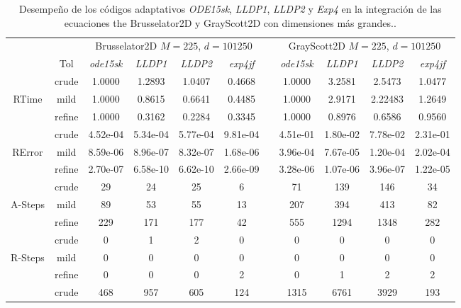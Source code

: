 \begin{table}
    \caption{Desempeño de los códigos adaptativos \emph{ODE15sk}, \emph{LLDP1}, \emph{LLDP2} y \emph{Exp4} en la integración de las ecuaciones the Brusselator2D y GrayScott2D con dimensiones más grandes..}
    \label{tab:Largerbruss2DGrayScott}
    \begin{adjustbox}{width=0.98\columnwidth,center}
        \begin{tabular}{ccccccccccc}
            \hline
            &  & \multicolumn{4}{c}{Brusselator2D $M=225$, $d=101250$} &  & \multicolumn{4}{c}{GrayScott2D $M=225$, $d=101250$} \\
            \cline{3-6}\cline{8-11} & Tol & \emph{ode15sk} & \emph{LLDP1} & \emph{LLDP2} & \emph{exp4jf} &  & \emph{ode15sk} & \emph{LLDP1} & \emph{LLDP2} & \emph{exp4jf} \\
            \hline
            & crude & 1.0000 & 1.2893 & 1.0407 & 0.4668 &  & 1.0000 & 3.2581 & 2.5473 & 1.0477 \\
            RTime & mild & 1.0000 & 0.8615 & 0.6641 & 0.4485 &  & 1.0000 & 2.9171 & 2.22483 & 1.2649 \\
            & refine & 1.0000 & 0.3162 & 0.2284 & 0.3345 &  & 1.0000 & 0.8976 & 0.6586 & 0.9560 \\
            \hline
            & crude & 4.52e-04 & 5.34e-04 & 5.77e-04 & 9.81e-04 &  & 4.51e-01 & 1.80e-02 & 7.78e-02 & 2.31e-01 \\
            RError & mild & 8.59e-06 & 8.96e-07 & 8.32e-07 & 1.68e-06 &  & 3.96e-04 & 7.67e-05 & 1.20e-04 & 2.02e-04 \\
            & refine & 2.70e-07 & 6.58e-10 & 6.62e-10 & 2.66e-09 &  & 3.28e-06 & 1.07e-06 & 3.96e-07 & 1.22e-05 \\
            \hline
            & crude & 29 & 24 & 25 & 6 &  & 71 & 139 & 146 & 34 \\
            A-Steps & mild & 89 & 53 & 55 & 13 &  & 207 & 394 & 413 & 82 \\
            & refine & 229 & 171 & 177 & 42 &  & 555 & 1294 & 1348 & 282 \\
            \hline
            & crude & 0 & 1 & 2 & 0 &  & 0 & 0 & 0 & 0 \\
            R-Steps & mild & 0 & 0 & 0 & 0 &  & 0 & 0 & 0 & 0 \\
            & refine & 0 & 0 & 0 & 2 &  & 0 & 1 & 2 & 2 \\
            \hline
            & crude & 468 & 957 & 605 & 124 &  & 1315 & 6761 & 3929 & 193 \\

\end{tabular}
\end{adjustbox}
\end{table}

